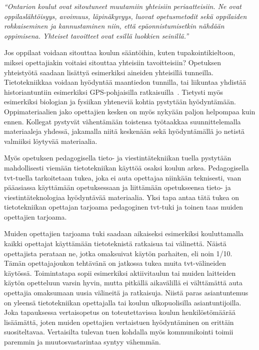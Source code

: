 \documentclass[utf8,bachelor]{gradu3}
\begin{document}
\textit{“Ontarion koulut ovat sitoutuneet muutamiin yhteisiin periaatteisiin. Ne ovat oppilaslähtöisyys, avoimuus, läpinäkyvyys, luovat opetusmetodit sekä oppilaiden rohkaiseminen ja kannustaminen niin, että epäonnistumisetkin nähdään oppimisena. Yhteiset tavoitteet ovat esillä luokkien seinillä.”} ~\parencite[][]{KanadanMalli}

Jos oppilaat voidaan sitouttaa koulun sääntöihin, kuten tupakointikieltoon, miksei opettajiakin voitaisi sitouttaa yhteisiin tavoitteisiin? Opetuksen yhteistyötä saadaan lisättyä esimerkiksi aineiden yhteisillä tunneilla. Tietotekniikkaa voidaan hyödyntää maantiedon tunnilla, tai liikuntaa yhdistää historiantuntiin esimerkiksi GPS-pohjaisilla ratkaisuilla~\parencite[][]{heijoe}. Tietysti myös esimerkiksi biologian ja fysiikan yhteneviä kohtia pystytään hyödyntämään. Oppimateriaalien jako opettajien kesken on myös nykyään paljon helpompaa kuin ennen. Kollegat pystyvät vähentämään toistensa työtaakkaa suunnittelemalla materiaaleja yhdessä, jakamalla niitä keskenään sekä hyödyntämällä jo netistä valmiiksi löytyvää materiaalia.


Myös opetuksen pedagogisella tieto- ja viestintätekniikan tuella pystytään mahdollisesti viemään tietotekniikan käyttöä osaksi koulun arkea. Pedagogisella tvt-tuella tarkoitetaan tukea, joka ei auta opettajaa niinkään teknisesti, vaan pääasiassa käyttämään opetuksessaan ja liittämään opetukseensa tieto- ja viestintäteknologiaa hyödyntävää materiaalia. Yksi tapa antaa tätä tukea on tietotekniikan opettajan tarjoama pedagoginen tvt-tuki ja toinen taas muiden opettajien tarjoama.

Muiden opettajien tarjoama tuki saadaan aikaiseksi esimerkiksi kouluttamalla kaikki opettajat käyttämään tietoteknistä ratkaisua tai välinettä. Näistä opettajista perataan ne, jotka omaksuivat käytön parhaiten, eli noin 1/10. Tämän opettajajoukon tehtävänä on jatkossa tukea muita tvt-välineiden käytössä. Toimintatapa sopii esimerkiksi aktiivitaulun tai muiden laitteiden käytön opetteluun varsin hyvin, mutta pitkällä aikavälillä ei välttämättä auta opettajia omaksumaan uusia välineitä ja ratkaisuja. Niistä paras asiantuntemus on yleensä tietotekniikan opettajalla tai koulun ulkopuolisilla asiantuntijoilla. Joka tapauksessa vertaisopetus on toteutettavissa koulun henkilöstömäärää lisäämättä, joten muiden opettajien vertaistuen hyödyntäminen on erittäin suositeltavaa. Vertaisilta tulevan tuen kohdalla myös kommunikointi toimii paremmin ja muutosvastarintaa syntyy vähemmän. ~\parencite[][]{kemia, koulunArki}
\end{document}
